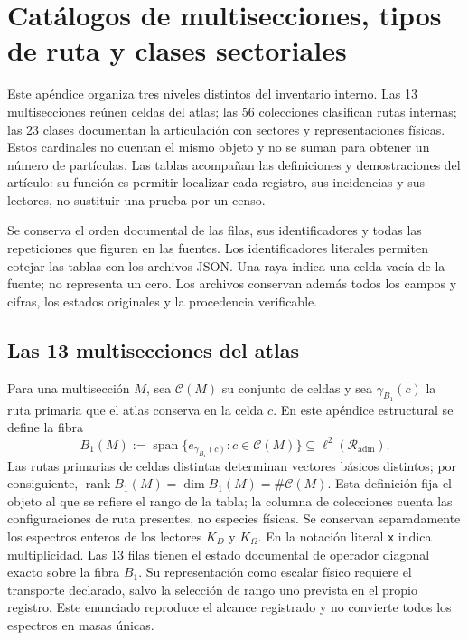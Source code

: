 \clearpage
\section{Catálogos de multisecciones, tipos de ruta y clases sectoriales}
\label{sec:vi-catalogos-estructurales}

Este apéndice organiza tres niveles distintos del inventario interno. Las
13 multisecciones reúnen celdas del atlas; las 56 colecciones clasifican rutas
internas; las 23 clases documentan la articulación con sectores y
representaciones físicas. Estos cardinales no cuentan el mismo objeto y
no se suman para obtener un número de partículas. Las tablas acompañan las
definiciones y demostraciones del artículo: su función es permitir localizar
cada registro, sus incidencias y sus lectores, no sustituir una prueba por un censo.

Se conserva el orden documental de las filas, sus identificadores y todas
las repeticiones que figuren en las fuentes. Los identificadores literales
permiten cotejar las tablas con los archivos JSON. Una raya indica una celda
vacía de la fuente; no representa un cero. Los archivos conservan además todos
los campos y cifras, los estados originales y la procedencia verificable.
\CatalogRouteReference

\subsection{Las 13 multisecciones del atlas}

Para una multisección \(M\), sea \(\mathcal C(M)\) su conjunto de celdas y
sea \(\gamma_{B_1}(c)\) la ruta primaria que el atlas conserva en la celda
\(c\). En este apéndice estructural se define la fibra
\[
 B_1(M):=
 \operatorname{span}\bigl\{e_{\gamma_{B_1}(c)}:c\in\mathcal C(M)\bigr\}
 \subseteq \ell^2(\mathcal R_{\mathrm{adm}}).
\]
Las rutas primarias de celdas distintas determinan vectores básicos distintos;
por consiguiente,
\(\operatorname{rank}B_1(M)=\dim B_1(M)=\#\mathcal C(M)\).
Esta definición fija el objeto al que se refiere el rango de la tabla; la
columna de colecciones cuenta las
configuraciones de ruta presentes, no especies físicas. Se conservan separadamente
los espectros enteros de los lectores \(K_D\) y \(K_\Omega\).
En la notación literal \texttt{x} indica multiplicidad. Las 13 filas tienen
el estado documental de operador diagonal exacto sobre la fibra \(B_1\).
Su representación como escalar físico requiere el transporte declarado, salvo
la selección de rango uno prevista en el propio registro. Este enunciado
reproduce el alcance registrado y no convierte todos los espectros en masas únicas.

